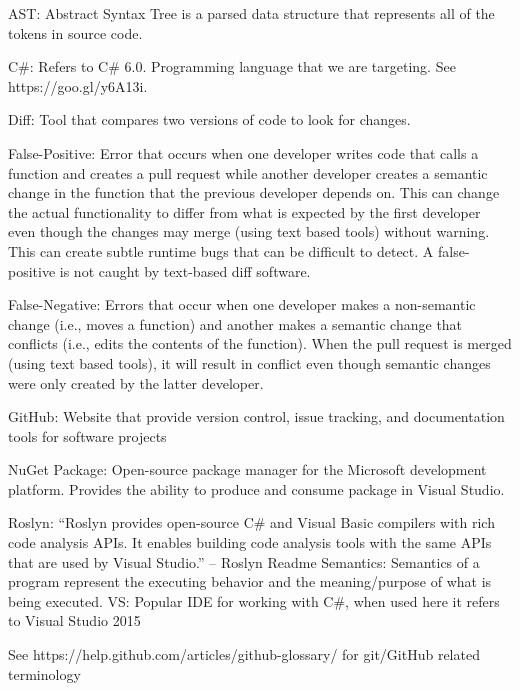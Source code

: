 \documentclass[10pt,draftclsnofoot,onecolumn]{IEEEtran}
\begin{document}
AST: Abstract Syntax Tree is a parsed data structure that represents all of the tokens in source code.

C\#: Refers to C\# 6.0. Programming language that we are targeting. See https://goo.gl/y6A13i.

Diff: Tool that compares two versions of code to look for changes.

False-Positive: Error that occurs when one developer writes code that calls a function and creates a pull request while another developer creates a semantic change in the function that the previous developer depends on. This can change the actual functionality to differ from what is expected by the first developer even though the changes may merge (using text based tools) without warning. This can create subtle runtime bugs that can be difficult to detect. A false-positive is not caught by text-based diff software.

False-Negative: Errors that occur when one developer makes a non-semantic change (i.e., moves a function) and another makes a semantic change that conflicts (i.e., edits the contents of the function). When the pull request is merged (using text based tools), it will result in conflict even though semantic changes were only created by the latter developer.

GitHub: Website that provide version control, issue tracking, and documentation tools for software projects

NuGet Package: Open-source package manager for the Microsoft development platform. Provides the ability to produce and consume package in Visual Studio.

Roslyn: “Roslyn provides open-source C\# and Visual Basic compilers with rich code analysis APIs. It enables building code analysis tools with the same APIs that are used by Visual Studio.” – Roslyn Readme 
Semantics: Semantics of a program represent the executing behavior and the meaning/purpose of what is being executed. 
VS: Popular IDE for working with C\#, when used here it refers to Visual Studio 2015

See https://help.github.com/articles/github-glossary/ for git/GitHub related terminology

\end{document}
